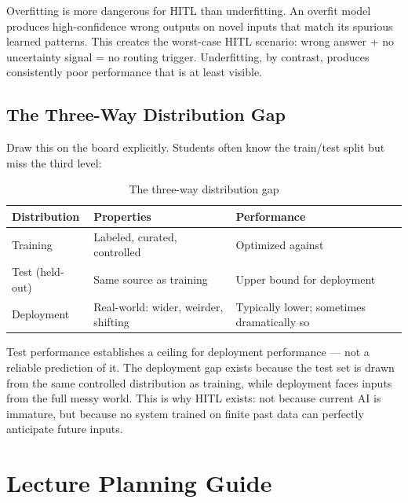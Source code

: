 \begin{cautionbox}
Overfitting is more dangerous for HITL than underfitting. An overfit model produces high-confidence wrong outputs on novel inputs that match its spurious learned patterns. This creates the worst-case HITL scenario: wrong answer + no uncertainty signal = no routing trigger. Underfitting, by contrast, produces consistently poor performance that is at least visible.
\end{cautionbox}

\subsection{The Three-Way Distribution Gap}

Draw this on the board explicitly. Students often know the train/test split but miss the third level:

\begin{table}[htbp]
\caption{The three-way distribution gap}
\label{tab:three-way-gap}
\centering
\begin{tabular}{@{}p{4cm}p{3.5cm}p{3.5cm}@{}}
\toprule
\textbf{Distribution} & \textbf{Properties} & \textbf{Performance} \\
\midrule
Training & Labeled, curated, controlled & Optimized against \\
Test (held-out) & Same source as training & Upper bound for deployment \\
Deployment & Real-world: wider, weirder, shifting & Typically lower; sometimes dramatically so \\
\bottomrule
\end{tabular}
\end{table}

\begin{keyconcept}
Test performance establishes a ceiling for deployment performance --- not a reliable prediction of it. The deployment gap exists because the test set is drawn from the same controlled distribution as training, while deployment faces inputs from the full messy world. This is why HITL exists: not because current AI is immature, but because no system trained on finite past data can perfectly anticipate future inputs.
\end{keyconcept}

\section{Lecture Planning Guide}

